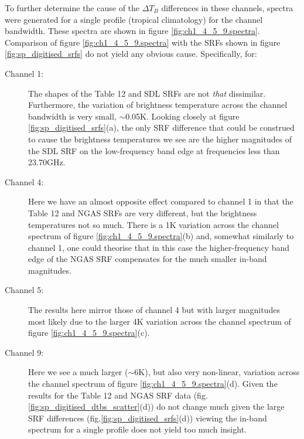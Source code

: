 To further determine the cause of the $\Delta T_B$ differences in these channels, spectra were generated for a single profile (tropical climatology) for the channel bandwidth. These spectra are shown in figure \ref{fig:ch1_4_5_9.spectra}. Comparison of figure \ref{fig:ch1_4_5_9.spectra} with the SRFs shown in figure \ref{fig:sp_digitised_srfs} do not yield any obvious cause. Specifically, for:
\begin{description}
  \item[Channel 1:] The shapes of the Table 12 and SDL SRFs are not \textit{that} dissimilar. Furthermore, the variation of brightness temperature across the channel bandwidth is very small, $\sim$0.05K. Looking closely at figure \ref{fig:sp_digitised_srfs}(a), the only SRF difference that could be construed to cause the brightness temperatures we see are the higher magnitudes of the SDL SRF on the low-frequency band edge at frequencies less than 23.70GHz.

  \item[Channel 4:] Here we have an almost opposite effect compared to channel 1 in that the Table 12 and NGAS SRFs are very different, but the brightness temperatures not so much. There is a 1K variation across the channel spectrum of figure \ref{fig:ch1_4_5_9.spectra}(b) and, somewhat similarly to channel 1, one could theorise that in this case the higher-frequency band edge of the NGAS SRF compensates for the much smaller in-band magnitudes.

  \item[Channel 5:] The results here mirror those of channel 4 but with larger magnitudes most likely due to the larger 4K variation across the channel spectrum of figure \ref{fig:ch1_4_5_9.spectra}(c).

  \item[Channel 9:] Here we see a much larger ($\sim$6K), but also very non-linear, variation across the channel spectrum of figure \ref{fig:ch1_4_5_9.spectra}(d). Given the results for the Table 12 and NGAS SRF data (fig.\ref{fig:sp_digitised_dtbs_scatter}(d)) do not change much given the large SRF differences (fig.\ref{fig:sp_digitised_srfs}(d)) viewing the in-band spectrum for a single profile does not yield too much insight.
\end{description}
 
